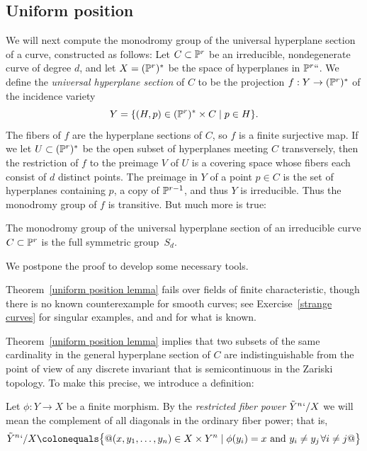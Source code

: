 \subsection*{Uniform position}


We will next compute the monodromy group of the  universal hyperplane
section of a curve, constructed as follows:
Let $C \subset {\mathbb P}^r$ be an irreducible, nondegenerate curve of degree
$d$, and let $X = ({\mathbb P}^r)^*$ be the space of hyperplanes in ${\mathbb P}^r``$. 
We define the \emph{universal hyperplane section} of $C$ to be the
%
projection  $f: Y\to ({\mathbb P}^r)^*$ of the incidence variety
$$
Y = \{ (H, p) \in ({\mathbb P}^r)^* \times C \mid p \in H \}.
$$
The fibers of $f$ are the hyperplane
sections of $C$, so $f$ is a finite surjective map. If we let $U\subset
({\mathbb P}^r)^*$ be the open subset of hyperplanes
meeting $C$ transversely, then the restriction of $f$ to the preimage $V$
of $U$ is a covering space
whose fibers each consist of $d$ distinct points. The preimage in $Y$
of a point $p\in C$ is the set of hyperplanes containing
$p$, a copy of ${\mathbb P}^{r-1}$, and thus $Y$ is irreducible. Thus the
monodromy group of $f$ is transitive. But much more is true:

\begin{theorem}
\label{uniform position lemma}
The 
monodromy group of the universal hyperplane section of an irreducible
curve $C \subset {\mathbb P}^r$ is the full symmetric group~$S_d$.
%
\end{theorem}

We postpone the proof to develop some necessary tools.

Theorem~\ref{uniform position lemma} fails over fields of finite
characteristic, though there is no known counterexample for smooth
curves; see Exercise~\ref{strange curves} for singular examples, and
\cite{Rathmann} and \cite{Kadets} for what is known.

Theorem~\ref{uniform position lemma} implies that two subsets of the
same cardinality in the general hyperplane section of $C$
are indistinguishable from the point of view of any discrete invariant
that is semicontinuous in the Zariski topology. To make this precise,
we introduce a definition:

\begin{definition}
Let $\phi : Y \to X$ be a finite morphism. By the 
\emph{restricted fiber power} 
%
$\tilde Y^n`/X$ we will mean the complement of all diagonals in
the ordinary fiber power; that is,
$$
\tilde Y^n`/X \colonequals  \bigl\{@ (x, y_1,\dots, y_n) \in X \times Y^n \mid
\phi(y_i) = x \text{ and } y_i \neq y_j \; \forall i \neq j @\bigr\}
$$
\end{definition}

